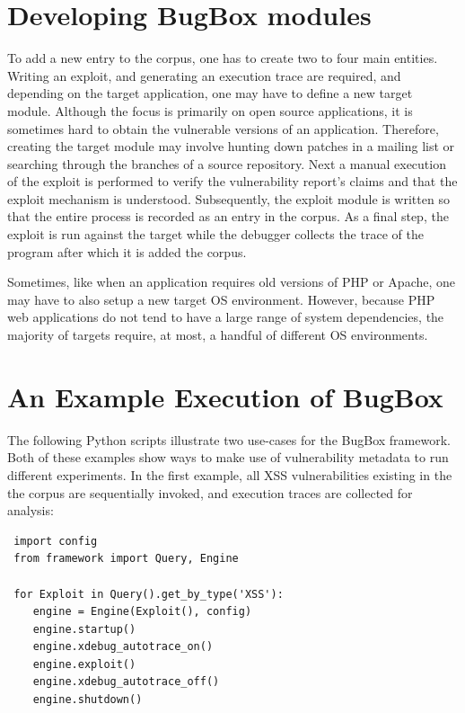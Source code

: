 \documentclass[letterpaper,twocolumn,10pt]{article}
\begin{document}
\section{Developing BugBox modules}

To add a new entry to the corpus, one has to create two to four main entities. Writing an exploit, and generating an execution trace are required, and depending on the target application, one may have to define a new target module.  Although the focus is primarily on open source applications, it is sometimes hard to obtain the vulnerable versions of an application. Therefore, creating the target module may involve hunting down patches in a mailing list or searching through the branches of a source repository. Next a manual execution of the exploit is performed to verify the vulnerability report's claims and that the exploit mechanism is understood. Subsequently, the exploit module is written so that the entire process is recorded as an entry in the corpus. As a final step, the exploit is run against the target while the debugger collects the trace of the program after which it is added the corpus.\par

Sometimes, like when an application requires old versions of PHP or Apache, one may have to also setup a new target OS environment. However, because PHP web applications do not tend to have a large range of system dependencies, the majority of targets require, at most, a handful of different OS environments. \par

\section {An Example Execution of BugBox}

The following Python scripts illustrate two use-cases for the BugBox framework. Both of these examples show ways to make use of vulnerability metadata to run different experiments. In the first example, all XSS vulnerabilities existing in the the corpus are sequentially invoked, and execution traces are collected for analysis:

\begin{minipage}{\textwidth}
{\tt \footnotesize

\begin{lstlisting}
 import config
 from framework import Query, Engine
 
 for Exploit in Query().get_by_type('XSS'):
    engine = Engine(Exploit(), config)
    engine.startup()
    engine.xdebug_autotrace_on()
    engine.exploit()
    engine.xdebug_autotrace_off()
    engine.shutdown()
\end{lstlisting}
}
\end{minipage}
\end{document}
